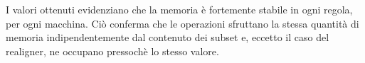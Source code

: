 \begin{table}[H]
\centering
{}
\caption{Media e deviazione standard, espresse in MB, della memoria occupata dalle regole su diversi subset da centomila reads.}
\label{varM}
\end{table}

I valori ottenuti evidenziano che la memoria è fortemente stabile in ogni regola, per ogni macchina.
Ciò conferma che le operazioni sfruttano la stessa quantità di memoria indipendentemente dal contenuto dei subset e, eccetto il caso del realigner, ne occupano pressochè lo stesso valore. 


